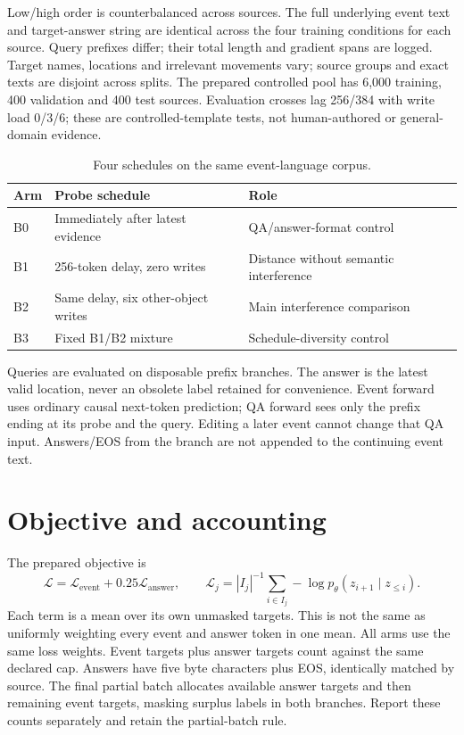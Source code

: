 \documentclass[11pt,a4paper]{article}
\begin{document}
Low/high order is counterbalanced across sources. The full underlying event
text and target-answer string are identical across the four training conditions
for each source. Query prefixes differ; their total length and gradient spans
are logged. Target names, locations and irrelevant movements vary; source
groups and exact texts are disjoint across splits. The prepared controlled
pool has 6,000 training, 400 validation and 400 test sources. Evaluation crosses
lag 256/384 with write load 0/3/6; these are controlled-template tests, not
human-authored or general-domain evidence.

\begin{table}[ht]\centering\small
\caption{Four schedules on the same event-language corpus.}
\begin{tabularx}{\linewidth}{lYY}\toprule
Arm & Probe schedule & Role\\\midrule
B0 & Immediately after latest evidence & QA/answer-format control\\
B1 & 256-token delay, zero writes & Distance without semantic interference\\
B2 & Same delay, six other-object writes & Main interference comparison\\
B3 & Fixed B1/B2 mixture & Schedule-diversity control\\
\bottomrule\end{tabularx}\end{table}

Queries are evaluated on disposable prefix branches. The answer is the latest
valid location, never an obsolete label retained for convenience. Event forward
uses ordinary causal next-token prediction; QA forward sees only the prefix
ending at its probe and the query. Editing a later event cannot change that QA
input. Answers/EOS from the branch are not appended to the continuing event text.

\section{Objective and accounting}
The prepared objective is
\[
\mathcal L=\mathcal L_{\mathrm{event}}+0.25\mathcal L_{\mathrm{answer}},
\qquad \mathcal L_j=|I_j|^{-1}\sum_{i\in I_j}-\log p_\theta(z_{i+1}\mid z_{\le i}).
\]
Each term is a mean over its own unmasked targets. This is not the same as
uniformly weighting every event and answer token in one mean. All arms use
the same loss weights. Event targets plus answer targets count against the
same declared cap. Answers have five byte characters plus EOS, identically
matched by source. The final partial batch allocates available answer targets
and then remaining event targets, masking surplus labels in both branches.
Report these counts separately and retain the partial-batch rule.
\end{document}
